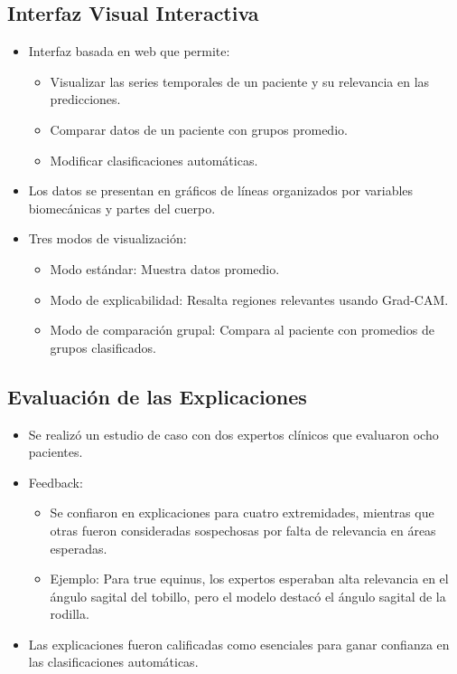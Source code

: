 \documentclass{report}
\begin{document}
\subsection{Interfaz Visual Interactiva}
\begin{itemize}
    \item Interfaz basada en web que permite:
    \begin{itemize}
        \item Visualizar las series temporales de un paciente y su relevancia en las predicciones.
        \item Comparar datos de un paciente con grupos promedio.
        \item Modificar clasificaciones automáticas.
    \end{itemize}
    \item Los datos se presentan en gráficos de líneas organizados por variables biomecánicas y partes del cuerpo.
    \item Tres modos de visualización:
    \begin{itemize}
        \item Modo estándar: Muestra datos promedio.
        \item Modo de explicabilidad: Resalta regiones relevantes usando Grad-CAM.
        \item Modo de comparación grupal: Compara al paciente con promedios de grupos clasificados.
    \end{itemize}
\end{itemize}

\subsection{Evaluación de las Explicaciones}
\begin{itemize}
    \item Se realizó un estudio de caso con dos expertos clínicos que evaluaron ocho pacientes.
    \item Feedback:
    \begin{itemize}
        \item Se confiaron en explicaciones para cuatro extremidades, mientras que otras fueron consideradas sospechosas por falta de relevancia en áreas esperadas.
        \item Ejemplo: Para true equinus, los expertos esperaban alta relevancia en el ángulo sagital del tobillo, pero el modelo destacó el ángulo sagital de la rodilla.
    \end{itemize}
    \item Las explicaciones fueron calificadas como esenciales para ganar confianza en las clasificaciones automáticas.
\end{itemize}
\end{document}

